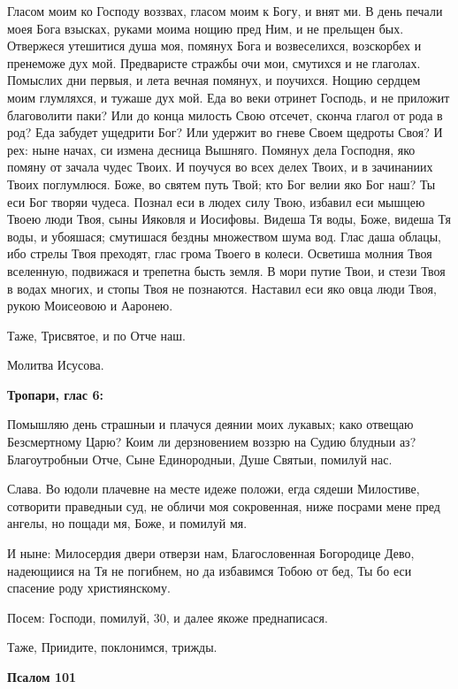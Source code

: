 Гласом моим ко Господу воззвах, гласом моим к Богу, и внят ми. В день печали моея Бога взысках, руками моима нощию пред Ним, и не прельщен бых. Отвержеся утешитися душа моя, помянух Бога и возвеселихся, возскорбех и пренеможе дух мой. Предваристе стражбы очи мои, смутихся и не глаголах. Помыслих дни первыя, и лета вечная помянух, и поучихся. Нощию сердцем моим глумляхся, и тужаше дух мой. Еда во веки отринет Господь, и не приложит благоволити паки? Или до конца милость Свою отсечет, сконча глагол от рода в род? Еда забудет ущедрити Бог? Или удержит во гневе Своем щедроты Своя? И рех: ныне начах, си измена десница Вышняго. Помянух дела Господня, яко помяну от зачала чудес Твоих. И поучуся во всех делех Твоих, и в зачинаниих Твоих поглумлюся. Боже, во святем путь Твой; кто Бог велии яко Бог наш? Ты еси Бог творяи чудеса. Познал еси в людех силу Твою, избавил еси мышцею Твоею люди Твоя, сыны Ияковля и Иосифовы. Видеша Тя воды, Боже, видеша Тя воды, и убояшася; смутишася бездны множеством шума вод. Глас даша облацы, ибо стрелы Твоя преходят, глас грома Твоего в колеси. Осветиша молния Твоя вселенную, подвижася и трепетна бысть земля. В мори путие Твои, и стези Твоя в водах многих, и стопы Твоя не познаются. Наставил еси яко овца люди Твоя, рукою Моисеовою и Ааронею.


Таже, Трисвятое, и по Отче наш.


Молитва Исусова.





\bfseries Тропари, глас 6:\normalfont{}


Помышляю день страшныи и плачуся деянии моих лукавых; како отвещаю Безсмертному Царю? Коим ли дерзновением воззрю на Судию блудныи аз? Благоутробныи Отче, Сыне Единородныи, Душе Святыи, помилуй нас.


Слава. Во юдоли плачевне на месте идеже положи, егда сядеши Милостиве, сотворити праведныи суд, не обличи моя сокровенная, ниже посрами мене пред ангелы, но пощади мя, Боже, и помилуй мя.


И ныне: Милосердия двери отверзи нам, Благословенная Богородице Дево, надеющиися на Тя не погибнем, но да избавимся Тобою от бед, Ты бо еси спасение роду християнскому.


Посем: Господи, помилуй, 30, и далее якоже преднаписася.


Таже, Приидите, поклонимся, трижды.





\bfseries Псалом 101\normalfont{}



